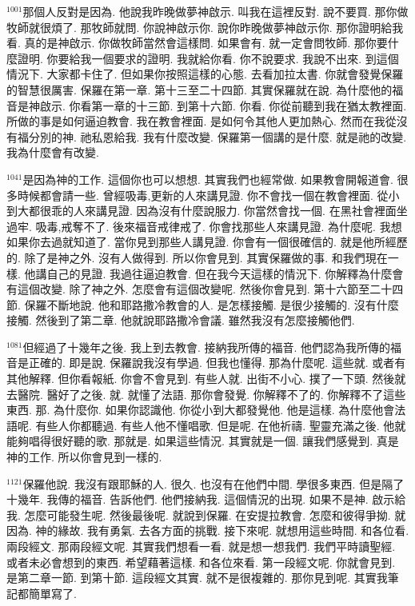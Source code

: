 \documentclass{book}
\begin{document}
$^{1001}$那個人反對是因為.
他說我昨晚做夢神啟示.
叫我在這裡反對.
說不要買.
那你做牧師就很煩了.
那牧師就問.
你說神啟示你.
說你昨晚做夢神啟示你.
那你證明給我看.
真的是神啟示.
你做牧師當然會這樣問.
如果會有.
就一定會問牧師.
那你要什麼證明.
你要給我一個要求的證明.
我就給你看.
你不說要求.
我說不出來.
到這個情況下.
大家都卡住了.
但如果你按照這樣的心態.
去看加拉太書.
你就會發覺保羅的智慧很厲害.
保羅在第一章.
第十三至二十四節.
其實保羅就在說.
為什麼他的福音是神啟示.
你看第一章的十三節.
到第十六節.
你看.
你從前聽到我在猶太教裡面.
所做的事是如何逼迫教會.
我在教會裡面.
是如何令其他人更加熱心.
然而在我從沒有福分別的神.
祂私恩給我.
我有什麼改變.
保羅第一個講的是什麼.
就是祂的改變.
我為什麼會有改變.

$^{1041}$是因為神的工作.
這個你也可以想想.
其實我們也經常做.
如果教會開報道會.
很多時候都會請一些.
曾經吸毒,更新的人來講見證.
你不會找一個在教會裡面.
從小到大都很乖的人來講見證.
因為沒有什麼說服力.
你當然會找一個.
在黑社會裡面坐過牢.
吸毒,戒奪不了.
後來福音戒律戒了.
你會找那些人來講見證.
為什麼呢.
我想如果你去過就知道了.
當你見到那些人講見證.
你會有一個很確信的.
就是他所經歷的.
除了是神之外.
沒有人做得到.
所以你會見到.
其實保羅做的事.
和我們現在一樣.
他講自己的見證.
我過往逼迫教會.
但在我今天這樣的情況下.
你解釋為什麼會有這個改變.
除了神之外.
怎麼會有這個改變呢.
然後你會見到.
第十六節至二十四節.
保羅不斷地說.
他和耶路撒冷教會的人.
是怎樣接觸.
是很少接觸的.
沒有什麼接觸.
然後到了第二章.
他就說耶路撒冷會議.
雖然我沒有怎麼接觸他們.

$^{1081}$但經過了十幾年之後.
我上到去教會.
接納我所傳的福音.
他們認為我所傳的福音是正確的.
即是說.
保羅說我沒有學過.
但我也懂得.
那為什麼呢.
這些就.
或者有其他解釋.
但你看報紙.
你會不會見到.
有些人就.
出街不小心.
撲了一下頭.
然後就去醫院.
醫好了之後.
就.
就懂了法語.
那你會發覺.
你解釋不了的.
你解釋不了這些東西.
那.
為什麼你.
如果你認識他.
你從小到大都發覺他.
他是這樣.
為什麼他會法語呢.
有些人你都聽過.
有些人他不懂唱歌.
但是呢.
在他祈禱.
聖靈充滿之後.
他就能夠唱得很好聽的歌.
那就是.
如果這些情況.
其實就是一個.
讓我們感覺到.
真是神的工作.
所以你會見到一樣的.

$^{1121}$保羅他說.
我沒有跟耶穌的人.
很久.
也沒有在他們中間.
學很多東西.
但是隔了十幾年.
我傳的福音.
告訴他們.
他們接納我.
這個情況的出現.
如果不是神.
啟示給我.
怎麼可能發生呢.
然後最後呢.
就說到保羅.
在安提拉教會.
怎麼和彼得爭拗.
就因為.
神的緣故.
我有勇氣.
去各方面的挑戰.
接下來呢.
就想用這些時間.
和各位看.
兩段經文.
那兩段經文呢.
其實我們想看一看.
就是想一想我們.
我們平時讀聖經.
或者未必會想到的東西.
希望藉著這樣.
和各位來看.
第一段經文呢.
你就會見到.
是第二章一節.
到第十節.
這段經文其實.
就不是很複雜的.
那你見到呢.
其實我筆記都簡單寫了.
\end{document}
